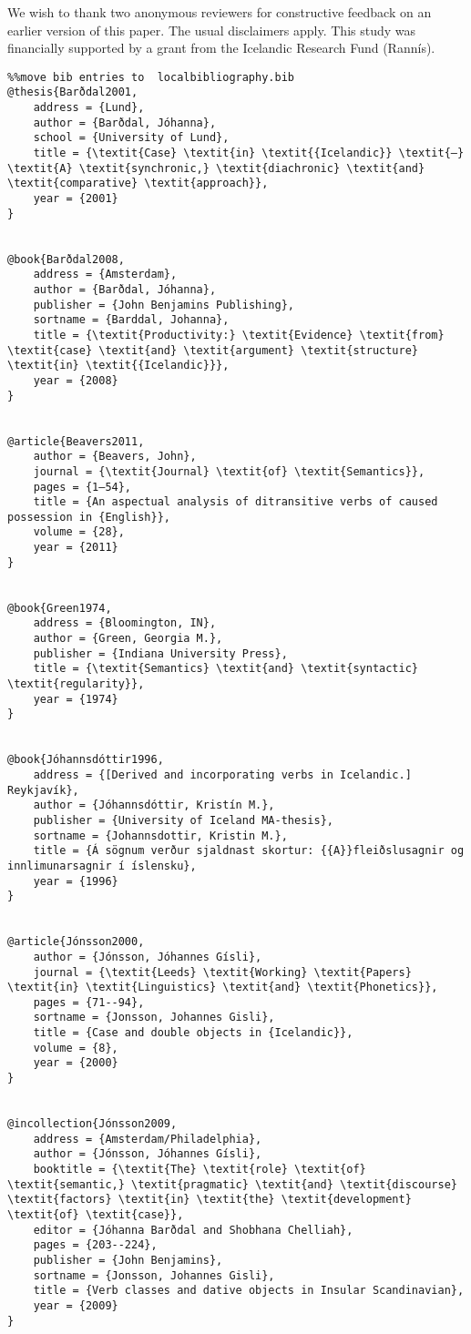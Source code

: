 \documentclass[output=paper,modfonts,nonflat]{langsci/langscibook}
\begin{document}
We wish to thank two anonymous reviewers for constructive feedback on an earlier version of this paper. The usual disclaimers apply. This study was financially supported by a grant from the Icelandic Research Fund (Rannís).
\begin{verbatim}%%move bib entries to  localbibliography.bib
@thesis{Barðdal2001,
	address = {Lund},
	author = {Barðdal, Jóhanna},
	school = {University of Lund},
	title = {\textit{Case} \textit{in} \textit{{Icelandic}} \textit{–} \textit{A} \textit{synchronic,} \textit{diachronic} \textit{and} \textit{comparative} \textit{approach}},
	year = {2001}
}


@book{Barðdal2008,
	address = {Amsterdam},
	author = {Barðdal, Jóhanna},
	publisher = {John Benjamins Publishing},
	sortname = {Barddal, Johanna},
	title = {\textit{Productivity:} \textit{Evidence} \textit{from} \textit{case} \textit{and} \textit{argument} \textit{structure} \textit{in} \textit{{Icelandic}}},
	year = {2008}
}


@article{Beavers2011,
	author = {Beavers, John},
	journal = {\textit{Journal} \textit{of} \textit{Semantics}},
	pages = {1–54},
	title = {An aspectual analysis of ditransitive verbs of caused possession in {English}},
	volume = {28},
	year = {2011}
}


@book{Green1974,
	address = {Bloomington, IN},
	author = {Green, Georgia M.},
	publisher = {Indiana University Press},
	title = {\textit{Semantics} \textit{and} \textit{syntactic} \textit{regularity}},
	year = {1974}
}


@book{Jóhannsdóttir1996,
	address = {[Derived and incorporating verbs in Icelandic.] Reykjavík},
	author = {Jóhannsdóttir, Kristín M.},
	publisher = {University of Iceland MA-thesis},
	sortname = {Johannsdottir, Kristin M.},
	title = {Á sögnum verður sjaldnast skortur: {{A}}fleiðslusagnir og innlimunarsagnir í íslensku},
	year = {1996}
}


@article{Jónsson2000,
	author = {Jónsson, Jóhannes Gísli},
	journal = {\textit{Leeds} \textit{Working} \textit{Papers} \textit{in} \textit{Linguistics} \textit{and} \textit{Phonetics}},
	pages = {71--94},
	sortname = {Jonsson, Johannes Gisli},
	title = {Case and double objects in {Icelandic}},
	volume = {8},
	year = {2000}
}


@incollection{Jónsson2009,
	address = {Amsterdam/Philadelphia},
	author = {Jónsson, Jóhannes Gísli},
	booktitle = {\textit{The} \textit{role} \textit{of} \textit{semantic,} \textit{pragmatic} \textit{and} \textit{discourse} \textit{factors} \textit{in} \textit{the} \textit{development} \textit{of} \textit{case}},
	editor = {Jóhanna Barðdal and Shobhana Chelliah},
	pages = {203--224},
	publisher = {John Benjamins},
	sortname = {Jonsson, Johannes Gisli},
	title = {Verb classes and dative objects in Insular Scandinavian},
	year = {2009}
}



\end{verbatim}
\end{document}
